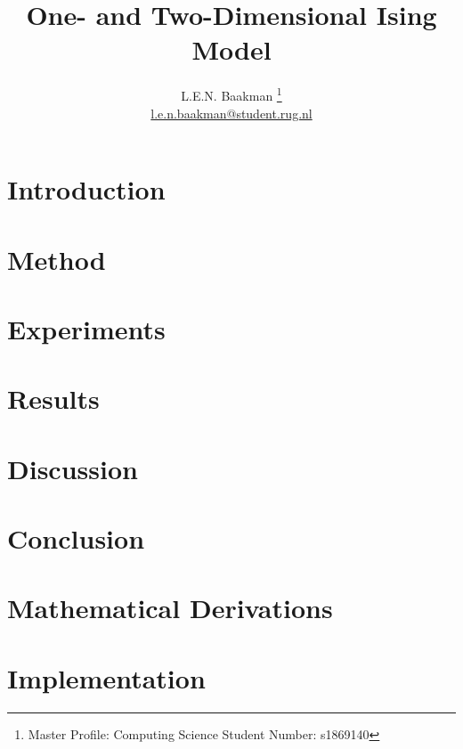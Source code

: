 \documentclass[oneside, a4paper, twocolumn, reqno, fleqn, 11pt]{article}
\title{\sc One- and Two-Dimensional Ising Model}
\author{L.E.N. Baakman%
	\thanks{%
		Master Profile: Computing Science\newline
	 	\hspace*{14pt} Student Number: s1869140%
	}\\%
	\href{mailto:l.e.n.baakman@student.rug.nl}{l.e.n.baakman@student.rug.nl}
}
\begin{document}
\maketitle

\section{Introduction}
\label{s:intro}


\section{Method}
\label{s:method}
	

\section{Experiments}
\label{s:experiment}
	

\section{Results}
\label{s:results}


\section{Discussion}
\label{s:discussion}


\section{Conclusion}
\label{s:conclusion}


\printbibliography

\onecolumn
\allowdisplaybreaks %

\appendix
\section{Mathematical Derivations}
\label{a:derivations}
% 

\section{Implementation}
\label{a:implementation}
% 
\end{document}
